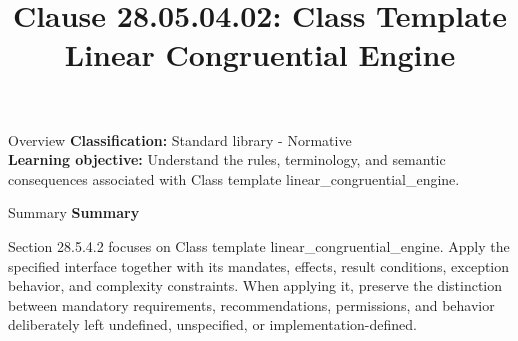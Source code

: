 \documentclass[10pt,letterpaper]{article}
\title{Clause 28.05.04.02: Class Template Linear Congruential Engine}
\author{}
\date{}
\begin{document}
\maketitle
\begin{CornellOverviewBox}{Overview}
\textbf{Classification:} Standard library - Normative\\[2pt]
\textbf{Learning objective:} Understand the rules, terminology, and semantic consequences associated with Class template linear\_congruential\_engine.
\end{CornellOverviewBox}\begin{CornellSummaryBox}{Summary}
{\sffamily\bfseries\color{Accent} Summary}\par\vspace{3pt}Section 28.5.4.2 focuses on Class template linear\_congruential\_engine. Apply the specified interface together with its mandates, effects, result conditions, exception behavior, and complexity constraints. When applying it, preserve the distinction between mandatory requirements, recommendations, permissions, and behavior deliberately left undefined, unspecified, or implementation-defined.
\end{CornellSummaryBox}
\end{document}
